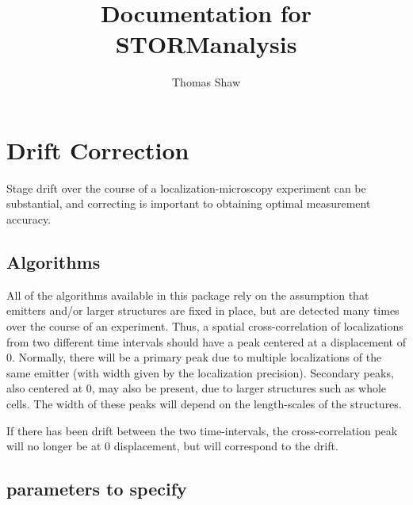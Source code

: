 \documentclass{article}
\title{Documentation for STORManalysis}
\author{Thomas Shaw}
\begin{document}
\maketitle


\section{Drift Correction}
Stage drift over the course of a localization-microscopy experiment can be
substantial, and correcting is important to obtaining optimal measurement
accuracy.

\subsection{Algorithms}

All of the algorithms available in this package rely on the assumption that
emitters and/or larger structures are fixed in place, but are detected many
times over the course of an experiment. Thus, a spatial cross-correlation of
localizations from two different time intervals should have a peak centered
at a displacement of 0. Normally, there will be a primary peak due to multiple
localizations of the same emitter (with width given by the localization precision).
Secondary peaks, also centered at 0, may also be present, due to larger structures
such as whole cells. The width of these peaks will depend on the length-scales of
the structures.

If there has been drift between the two time-intervals, the cross-correlation peak
will no longer be at 0 displacement, but will correspond to the drift.

\subsection{parameters to specify}
\end{document}
